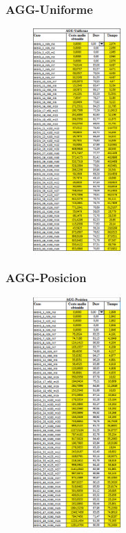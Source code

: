 \documentclass{article}
\begin{document}
    \pagebreak
    \subsubsection{AGG-Uniforme}

    \begin{figure}[h]
        \centering
        \includegraphics[width=0.3\textwidth]{tablaAGGU.png}
    \end{figure}

    \pagebreak
    \subsubsection{AGG-Posicion}

    \begin{figure}[h]
        \centering
        \includegraphics[width=0.3\textwidth]{tablaAGGP.png}
    \end{figure}
\end{document}
